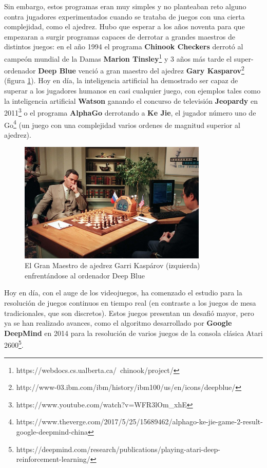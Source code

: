 Sin embargo, estos programas eran muy simples y no planteaban reto alguno contra jugadores experimentados cuando se trataba de juegos con una cierta complejidad, como el ajedrez. Hubo que esperar a los años noventa para que empezaran a surgir programas capaces de derrotar a grandes maestros de distintos juegos: en el año 1994 el programa \textbf{Chinook Checkers} derrotó al campeón mundial de la Damas \textbf{Marion Tinsley}\footnote{https://webdocs.cs.ualberta.ca/~chinook/project/} y 3 años más tarde el super-ordenador \textbf{Deep Blue} venció a gran maestro del ajedrez \textbf{Gary Kasparov}\footnote{http://www-03.ibm.com/ibm/history/ibm100/us/en/icons/deepblue/} (figura \ref{deepblue-vs-kasparov}). Hoy en día, la inteligencia artificial ha demostrado ser capaz de superar a los jugadores humanos en casi cualquier juego, con ejemplos tales como la inteligencia artificial \textbf{Watson} ganando el concurso de televisión \textbf{Jeopardy} en 2011\footnote{https://www.youtube.com/watch?v=WFR3lOm\_xhE} o el programa \textbf{AlphaGo} derrotando a \textbf{Ke Jie}, el jugador número uno de Go\footnote{https://www.theverge.com/2017/5/25/15689462/alphago-ke-jie-game-2-result-google-deepmind-china} (un juego con una complejidad varios ordenes de magnitud superior al ajedrez).

\begin{figure}[h]
	\includegraphics[width=0.8\textwidth]{images/estadodelarte/ai/deepblue-vs-kasparov}
	\centering
	\caption{El Gran Maestro de ajedrez Garri Kaspárov (izquierda) enfrentándose al ordenador Deep Blue}
	\label{deepblue-vs-kasparov}
\end{figure}

Hoy en día, con el auge de los videojuegos, ha comenzado el estudio para la resolución de juegos continuos en tiempo real (en contraste a los juegos de mesa tradicionales, que son discretos). Estos juegos presentan un desafió mayor, pero ya se han realizado avances, como el algoritmo desarrollado por \textbf{Google DeepMind} en 2014 para la resolución de varios juegos de la consola clásica Atari 2600\footnote{https://deepmind.com/research/publications/playing-atari-deep-reinforcement-learning/}.

